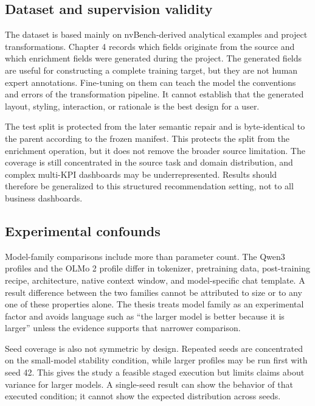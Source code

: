 \subsection{Dataset and supervision validity}

The dataset is based mainly on nvBench-derived analytical examples and project transformations. Chapter 4 records which fields originate from the source and which enrichment fields were generated during the project. The generated fields are useful for constructing a complete training target, but they are not human expert annotations. Fine-tuning on them can teach the model the conventions and errors of the transformation pipeline. It cannot establish that the generated layout, styling, interaction, or rationale is the best design for a user.

The test split is protected from the later semantic repair and is byte-identical to the parent according to the frozen manifest. This protects the split from the enrichment operation, but it does not remove the broader source limitation. The coverage is still concentrated in the source task and domain distribution, and complex multi-KPI dashboards may be underrepresented. Results should therefore be generalized to this structured recommendation setting, not to all business dashboards.

\subsection{Experimental confounds}

Model-family comparisons include more than parameter count. The Qwen3 profiles and the OLMo 2 profile differ in tokenizer, pretraining data, post-training recipe, architecture, native context window, and model-specific chat template. A result difference between the two families cannot be attributed to size or to any one of these properties alone. The thesis treats model family as an experimental factor and avoids language such as ``the larger model is better because it is larger'' unless the evidence supports that narrower comparison.

Seed coverage is also not symmetric by design. Repeated seeds are concentrated on the small-model stability condition, while larger profiles may be run first with seed 42. This gives the study a feasible staged execution but limits claims about variance for larger models. A single-seed result can show the behavior of that executed condition; it cannot show the expected distribution across seeds.

